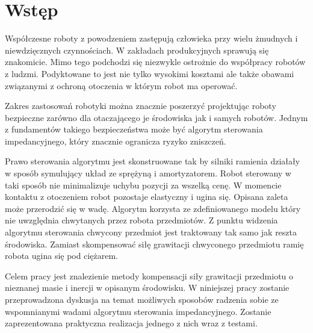 
\chapter{Wstęp\label{chap:wstep}}

	Współczesne roboty z powodzeniem zastępują człowieka przy wielu żmudnych i niewdzięcznych czynnościach.  W zakładach produkcyjnych sprawują się znakomicie. Mimo tego podchodzi się niezwykle ostrożnie do współpracy robotów z ludzmi. Podyktowane to jest nie tylko wysokimi kosztami ale także obawami związanymi z ochroną otoczenia w którym robot ma operować.
	
	Zakres zastosowań robotyki można znacznie poszerzyć projektując roboty bezpieczne zarówno dla otaczającego je środowiska jak i samych robotów. Jednym z fundamentów takiego bezpieczeństwa może być algorytm sterowania impedancyjnego, który znacznie ogranicza ryzyko zniszczeń. 
	
	Prawo sterowania algorytmu jest skonstruowane tak by silniki ramienia działały w sposób symulujący układ ze sprężyną i amortyzatorem. Robot sterowany w taki sposób nie minimalizuje uchybu pozycji za wszelką cenę. W momencie kontaktu z otoczeniem robot pozostaje elastyczny i ugina się. Opisana zaleta może przerodzić się w wadę. Algorytm korzysta ze zdefiniowanego modelu który nie uwzględnia chwytanych przez robota przedmiotów. Z punktu widzenia algorytmu sterowania chwycony przedmiot jest traktowany tak samo jak reszta środowiska. Zamiast skompensować siłę grawitacji chwyconego przedmiotu ramię robota ugina się pod ciężarem. 

	Celem pracy jest znalezienie metody kompensacji siły grawitacji przedmiotu o nieznanej masie i inercji w opisanym środowisku. W niniejszej pracy zostanie przeprowadzona dyskusja na temat możliwych sposobów radzenia sobie ze wspomnianymi wadami algorytmu sterowania impedancyjnego. Zostanie zaprezentowana praktyczna realizacja jednego z nich wraz z testami.
